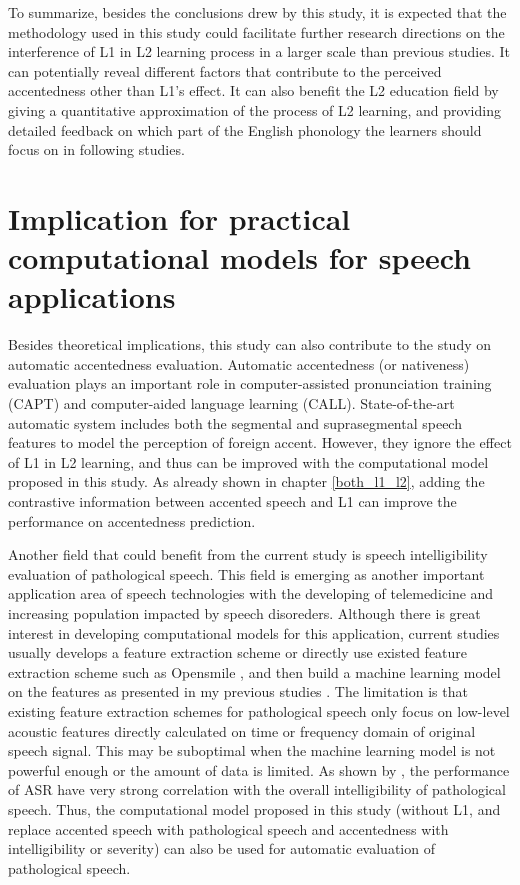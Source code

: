 To summarize, besides the conclusions drew by this study, it is expected that the methodology used in this study could facilitate further research directions on the interference of L1 in L2 learning process in a larger scale than previous studies. It can potentially reveal different factors that contribute to the perceived accentedness other than L1's effect. It can also benefit the L2 education field by giving a quantitative approximation of the process of L2 learning, and providing detailed feedback on which part of the English phonology the learners should focus on in following studies.

\section{Implication for practical computational models for speech applications}

Besides theoretical implications, this study can also contribute to the study on automatic accentedness evaluation. Automatic accentedness (or nativeness) evaluation plays an important role in computer-assisted pronunciation training (CAPT) and computer-aided language learning (CALL). State-of-the-art automatic system includes both the segmental and suprasegmental speech features to model the perception of foreign accent. However, they ignore the effect of L1 in L2 learning, and thus can be improved with the computational model proposed in this study. As already shown in chapter \ref{both_l1_l2}, adding the contrastive information between accented speech and L1 can improve the performance on accentedness prediction.

Another field that could benefit from the current study is speech intelligibility evaluation of pathological speech. This field is emerging as another important application area of speech technologies with the developing of telemedicine and increasing population impacted by speech disoreders. Although there is great interest in developing computational models for this application, current studies usually develops a feature extraction scheme or directly use existed feature extraction scheme such as Opensmile \citep{eyben2010opensmile}, and then build a machine learning model on the features as presented in my previous studies \citep{tu2016models,tu2017interpretable,tu2017objective}. The limitation is that existing feature extraction schemes for pathological speech only focus on low-level acoustic features directly calculated on time or frequency domain of original speech signal. This may be suboptimal when the machine learning model is not powerful enough or the amount of data is limited. As shown by \cite{tu2016relationship}, the performance of ASR have very strong correlation with the overall intelligibility of pathological speech. Thus, the computational model proposed in this study (without L1, and replace accented speech with pathological speech and accentedness with intelligibility or severity) can also be used for automatic evaluation of pathological speech.

